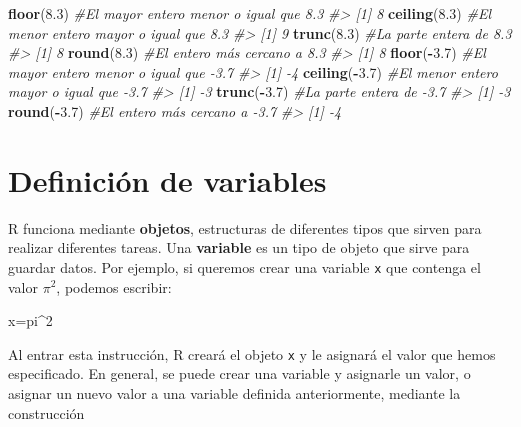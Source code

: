 \documentclass[
]{book}
\newenvironment{Shaded}{\begin{snugshade}}{\end{snugshade}}
\newcommand{\CommentTok}[1]{\textcolor[rgb]{0.56,0.35,0.01}{\textit{#1}}}
\newcommand{\DecValTok}[1]{\textcolor[rgb]{0.00,0.00,0.81}{#1}}
\newcommand{\FloatTok}[1]{\textcolor[rgb]{0.00,0.00,0.81}{#1}}
\newcommand{\KeywordTok}[1]{\textcolor[rgb]{0.13,0.29,0.53}{\textbf{#1}}}
\newcommand{\NormalTok}[1]{#1}
\newcommand{\OperatorTok}[1]{\textcolor[rgb]{0.81,0.36,0.00}{\textbf{#1}}}
\theoremstyle{definition}
\theoremstyle{definition}
\theoremstyle{definition}
\theoremstyle{remark}
\begin{document}
\begin{Shaded}
\begin{Highlighting}[]
\KeywordTok{floor}\NormalTok{(}\FloatTok{8.3}\NormalTok{) }\CommentTok{\#El mayor entero menor o igual que 8.3}
\CommentTok{\#\textgreater{} [1] 8}
\KeywordTok{ceiling}\NormalTok{(}\FloatTok{8.3}\NormalTok{) }\CommentTok{\#El menor entero mayor o igual que 8.3}
\CommentTok{\#\textgreater{} [1] 9}
\KeywordTok{trunc}\NormalTok{(}\FloatTok{8.3}\NormalTok{) }\CommentTok{\#La parte entera de 8.3}
\CommentTok{\#\textgreater{} [1] 8}
\KeywordTok{round}\NormalTok{(}\FloatTok{8.3}\NormalTok{) }\CommentTok{\#El entero más cercano a 8.3}
\CommentTok{\#\textgreater{} [1] 8}
\KeywordTok{floor}\NormalTok{(}\OperatorTok{{-}}\FloatTok{3.7}\NormalTok{) }\CommentTok{\#El mayor entero menor o igual que {-}3.7}
\CommentTok{\#\textgreater{} [1] {-}4}
\KeywordTok{ceiling}\NormalTok{(}\OperatorTok{{-}}\FloatTok{3.7}\NormalTok{) }\CommentTok{\#El menor entero mayor o igual que {-}3.7}
\CommentTok{\#\textgreater{} [1] {-}3}
\KeywordTok{trunc}\NormalTok{(}\OperatorTok{{-}}\FloatTok{3.7}\NormalTok{) }\CommentTok{\#La parte entera de {-}3.7}
\CommentTok{\#\textgreater{} [1] {-}3}
\KeywordTok{round}\NormalTok{(}\OperatorTok{{-}}\FloatTok{3.7}\NormalTok{) }\CommentTok{\#El entero más cercano a {-}3.7}
\CommentTok{\#\textgreater{} [1] {-}4}
\end{Highlighting}
\end{Shaded}

\hypertarget{definiciuxf3n-de-variables}{%
\section{Definición de variables}\label{definiciuxf3n-de-variables}}

R funciona mediante \textbf{objetos}, estructuras de diferentes tipos que sirven para realizar diferentes tareas. Una \textbf{variable} es un tipo de objeto que sirve para guardar datos.
Por ejemplo, si queremos crear una variable \texttt{x} que contenga el valor \(\pi^2\), podemos escribir:

\begin{Shaded}
\begin{Highlighting}[]
\NormalTok{x=pi}\OperatorTok{\^{}}\DecValTok{2}
\end{Highlighting}
\end{Shaded}

Al entrar esta instrucción, R creará el objeto \texttt{x} y le asignará el valor que hemos especificado.
En general, se puede crear una variable y asignarle un valor, o asignar un nuevo valor a una variable definida anteriormente, mediante
la construcción
\end{document}
